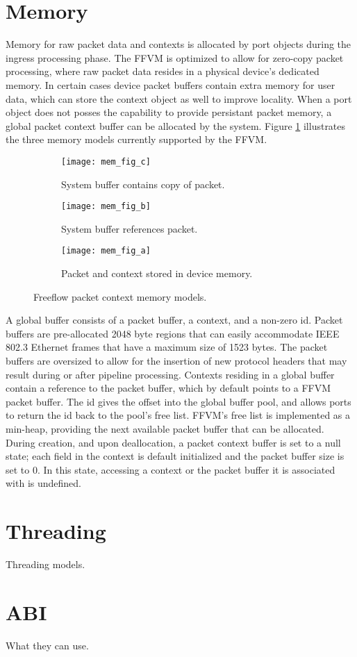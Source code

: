 \section{Memory}
\label{vm:memory}
Memory for raw packet data and contexts is allocated by port objects during the
ingress processing phase. The FFVM is optimized to allow for zero-copy packet
processing, where raw packet data resides in a physical device's dedicated
memory. In certain cases device packet buffers contain extra memory for user
data, which can store the context object as well to improve locality. When a
port object does not posses the capability to provide persistant packet memory,
a global packet context buffer can be allocated by the system. Figure
\ref{mem_model} illustrates the three memory models currently supported by the
FFVM.

\begin{figure}[h]
  \centering
  \begin{subfigure}[b]{0.48\textwidth}
    \centering
    \texttt{[image: mem\_fig\_c]}
    \caption{System buffer contains copy of packet.}
  \end{subfigure}
  \hfill
  \begin{subfigure}[b]{0.45\textwidth}
    \centering
    \texttt{[image: mem\_fig\_b]}
    \caption{System buffer references packet.}
  \end{subfigure}
  \begin{subfigure}[b]{0.55\textwidth}
    \centering
    \texttt{[image: mem\_fig\_a]}
    \caption{Packet and context stored in device memory.}
  \end{subfigure}
  \caption{Freeflow packet context memory models.}
  \label{mem_model}
\end{figure}

A global buffer consists of a packet buffer, a context, and a non-zero
id. Packet buffers are pre-allocated 2048 byte regions that can easily
accommodate IEEE 802.3 Ethernet frames that have a maximum size of 1523 bytes.
The packet buffers are oversized to allow for the insertion of new protocol
headers that may result during or after pipeline processing. Contexts residing
in a global buffer contain a reference to the packet buffer, which by default
points to a FFVM packet buffer. The id gives the offset into the global buffer
pool, and allows ports to return the id back to the pool's free list. FFVM's
free list is implemented as a min-heap, providing the next available packet
buffer that can be allocated. During creation, and upon deallocation, a packet
context buffer is set to a null state; each field in the context is default
initialized and the packet buffer size is set to 0. In this state, accessing a
context or the packet buffer it is associated with is undefined.

\section{Threading}
\label{vm:threading}
Threading models.

\section{ABI}
\label{vm:abi}
What they can use.
